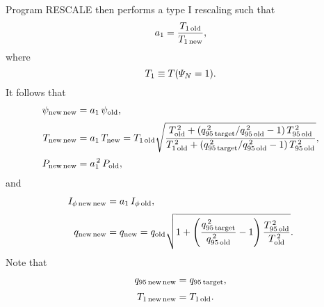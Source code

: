 \documentclass[12pt]{article}
\begin{document}
Program {\sc RESCALE} then performs a type I rescaling such that 
\begin{equation}
a_1 = \frac{T_{1\,{\rm old}}}{T_{1\,{\rm new}}},
\end{equation}
where 
\begin{equation}
T_{1}\equiv  T({\mit\Psi}_N=1).
\end{equation}
It follows that 
\begin{align}
\psi_{\rm new\,new} &= a_1\,\psi_{\rm old},\\[0.5ex]
T_{\rm new\,new} &=a_1\,T_{\rm new} = T_{1\,{\rm old}}
\sqrt{
\frac{T_{\rm old}^{\,2} + (q_{95\,{\rm target}}^{\,2}/q_{95\,{\rm old}}^{\,2}-1)\,T_{95\,{\rm old}}^{\,2}}
{T_{1\,{\rm old}}^{\,2} + (q_{95\,{\rm target}}^{\,2}/q_{95\,{\rm old}}^{\,2}-1)\,T_{95\,{\rm old}}^{\,2}}
},
\\[0.5ex]
P_{\rm new\,new} &=a_1^{\,2}\,P_{\rm old},
\end{align}
and
\begin{align}
I_{\phi\,{\rm new\,new}} &= a_1\,I_{\phi\,{\rm old}},\\[0.5ex]
q_{\rm new\,new} &= q_{\rm new}= q_{\rm old}\sqrt{1 +\left(\frac{q_{95\,{\rm target}}^{\,2}}{q_{95\,{\rm old}}^{\,2}}-1\right)\frac{T_{95\,{\rm old}}^{\,2}}{T_{\rm old}^{\,2}}}.
\end{align}
Note that
\begin{align}
q_{95\,{\rm new\,new}} &= q_{95\,{\rm target}},\\[0.5ex]
T_{1\,{\rm new\,new}} &= T_{1\,{\rm old}}.
\end{align}
\end{document}
